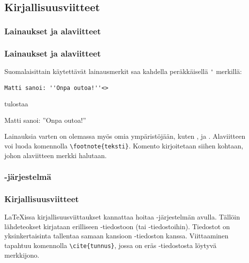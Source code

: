 \subsection{Kirjallisuusviitteet}

\subsubsection{Lainaukset ja alaviitteet}
\begin{frame}[fragile]
    \frametitle{Lainaukset ja alaviitteet}
    Suomalaisittain käytettävät lainausmerkit saa kahdella peräkkäisellä \lstinline-'- merkillä:
    \begin{lstlisting}
Matti sanoi: ''Onpa outoa!''<>
    \end{lstlisting}
    tulostaa
    \begin{sample}
        Matti sanoi: ''Onpa outoa!''
    \end{sample}
    Lainauksia varten on olemassa myös omia ympäristöjään, kuten ,  ja .
    \vaihto
    Alaviitteen voi luoda komennolla \lstinline-\footnote{teksti}-. Komento kirjoitetaan siihen kohtaan, johon alaviitteen merkki halutaan. 
\end{frame}

\begin{frame}[fragile]
    
    
\end{frame}

\subsubsection{\BibTeX-järjestelmä}
\begin{frame}[fragile]
    \frametitle{Kirjallisuusviitteet}
    \LaTeX issa kirjallisuusviittaukset kannattaa hoitaa \BibTeX-järjestelmän avulla. 
    \vaihto
    Tällöin lähdeteokset kirjataan erilliseen -tiedostoon (tai -tiedostoihin).
    \vaihto
    Tiedostot on yksinkertaisinta tallentaa samaan kansioon -tiedoston kanssa.
    \vaihto
    Viittaaminen tapahtuu komennolla \lstinline-\cite{tunnus}-, jossa  on eräs -tiedostosta löytyvä merkkijono.
\end{frame}

